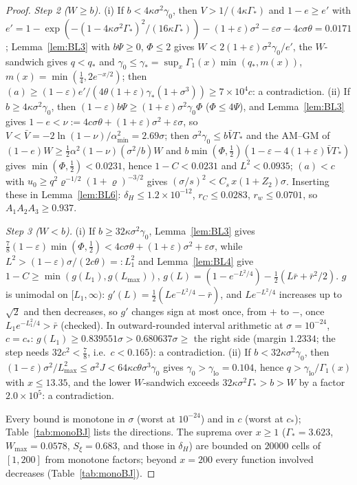 \begin{proof}
\emph{Step 2 ($W\ge b$).} (i) If $b<4\kappa\sigma^2\gamma_0$, then $V>1/(4\kappa\Gamma_*)$ and $1-e\ge e'$ with
$e'=1-\exp(-(1-4\kappa\sigma^2\Gamma_*)^2/(16\kappa\Gamma_*))-(1+\varepsilon)\sigma^2-\varepsilon\sigma-4c\sigma\theta=0.0171$; Lemma~\ref{lem:BL3} with $b\Psi\ge0$,
$\Phi\le2$ gives $W<2(1+\varepsilon)\sigma^2\gamma_0/e'$, the $W$-sandwich gives $q<q_*$ and $\gamma_0\le\gamma_*=\sup_x\Gamma_1(x)\min(q_*,m(x))$,
$m(x)=\min(\tfrac14,2e^{-x/2})$; then $(a)\ge(1-\varepsilon)e'/(4\theta(1+\varepsilon)\gamma_*(1+\sigma^3))\ge7\times10^4c$: a contradiction.
(ii) If $b\ge4\kappa\sigma^2\gamma_0$, then $(1-\varepsilon)b\Psi\ge(1+\varepsilon)\sigma^2\gamma_0\Phi$ ($\Phi\le4\Psi$), and Lemma~\ref{lem:BL3} gives
$1-e<\nu:=4c\sigma\theta+(1+\varepsilon)\sigma^2+\varepsilon\sigma$, so $V<\bar V=-2\ln(1-\nu)/\alpha^2_{\min}=2.69\sigma$; then $\sigma^2\gamma_0\le b\bar V\Gamma_*$ and the AM--GM of
$(1-e)W\ge\tfrac12\alpha^2(1-\nu)(\sigma^2/b)W$ and $b\min(\Phi,\frac12)(1-\varepsilon-4(1+\varepsilon)\bar V\Gamma_*)$ gives $\min(\Phi,\frac12)<0.0231$, hence
$1-C<0.0231$ and $L^2<0.0935$; $(a)<c$ with $u_0\ge q^2\varrho^{-1/2}(1+\varrho)^{-3/2}$ gives $(\sigma/s)^2<C_s\,x(1+Z_2)\sigma$. Inserting these
in Lemma~\ref{lem:BL6}: $\delta_H\le1.2\times10^{-12}$, $r_C\le0.0283$, $r_w\le0.0701$, so $A_1A_2A_3\ge0.937$.

\emph{Step 3 ($W<b$).} (i) If $b\ge32\kappa\sigma^2\gamma_0$, Lemma~\ref{lem:BL3} gives $\tfrac78(1-\varepsilon)\min(\Phi,\frac12)<4c\sigma\theta+(1+\varepsilon)\sigma^2+\varepsilon\sigma$,
while $L^2>(1-\varepsilon)\sigma/(2c\theta)=:L_1^2$ and Lemma~\ref{lem:BL4} give $1-C\ge\min(g(L_1),g(L_{\max}))$, $g(L)=(1-e^{-L^2/4})-\tfrac12(L\bar r+\bar r^2/2)$.
$g$ is unimodal on $[L_1,\infty)$: $g'(L)=\frac12(Le^{-L^2/4}-\bar r)$, and $Le^{-L^2/4}$ increases up to $\sqrt2$ and then decreases, so $g'$ changes
sign at most once, from $+$ to $-$, once $L_1e^{-L_1^2/4}>\bar r$ (checked). In outward-rounded interval arithmetic at $\sigma=10^{-24}$,
$c=c_*$: $g(L_1)\ge0.839551\sigma>0.680637\sigma\ge$ the right side (margin $1.2334$; the step needs $32c^2<\tfrac78$, i.e.\ $c<0.165$): a contradiction.
(ii) If $b<32\kappa\sigma^2\gamma_0$, then $(1-\varepsilon)\sigma^2/L^2_{\max}\le\sigma^2J<64\kappa c\theta\sigma^3\gamma_0$ gives $\gamma_0>\gamma_{\mathrm{lo}}=0.104$, hence
$q>\gamma_{\mathrm{lo}}/\Gamma_1(x)$ with $x\le13.35$, and the lower $W$-sandwich exceeds $32\kappa\sigma^2\Gamma_*>b>W$ by a factor $2.0\times10^{5}$: a contradiction.

Every bound is monotone in $\sigma$ (worst at $10^{-24}$) and in $c$ (worst at $c_*$); Table~\ref{tab:monoBJ} lists the directions. The suprema over $x\ge1$
($\Gamma_*=3.623$, $W_{\max}=0.0578$, $S_\xi=0.683$, and those in $\delta_H$) are bounded on $20000$ cells of $[1,200]$ from monotone factors; beyond $x=200$
every function involved decreases (Table~\ref{tab:monoBJ}).
\end{proof}

